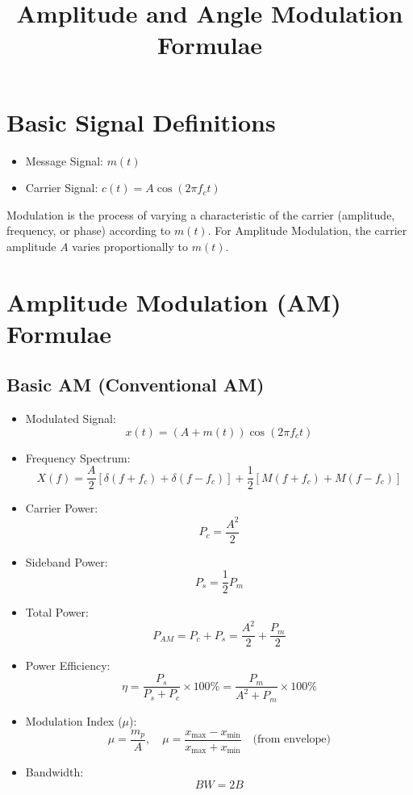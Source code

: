 \documentclass[12pt]{AnantDocumentatioe}
\title{Amplitude and Angle Modulation Formulae}
\author{}
\date{}
\begin{document}
\maketitle

\section{Basic Signal Definitions}

\begin{itemize}
    \item Message Signal: $m(t)$
    \item Carrier Signal: $c(t) = A \cos(2\pi f_c t)$
\end{itemize}

Modulation is the process of varying a characteristic of the carrier (amplitude, frequency, or phase) according to $m(t)$. For Amplitude Modulation, the carrier amplitude $A$ varies proportionally to $m(t)$.

\section{Amplitude Modulation (AM) Formulae}

\subsection{Basic AM (Conventional AM)}

\begin{itemize}
    \item Modulated Signal:
    \[
        x(t) = (A + m(t)) \cos(2\pi f_c t)
    \]
    \item Frequency Spectrum:
    \[
        X(f) = \frac{A}{2}[\delta(f+f_c) + \delta(f-f_c)] + \frac{1}{2}[M(f+f_c) + M(f-f_c)]
    \]
    \item Carrier Power:
    \[
        P_c = \frac{A^2}{2}
    \]
    \item Sideband Power:
    \[
        P_s = \frac{1}{2} P_m
    \]
    \item Total Power:
    \[
        P_{AM} = P_c + P_s = \frac{A^2}{2} + \frac{P_m}{2}
    \]
    \item Power Efficiency:
    \[
        \eta = \frac{P_s}{P_s + P_c} \times 100\% = \frac{P_m}{A^2 + P_m} \times 100\%
    \]
    \item Modulation Index ($\mu$):
    \[
        \mu = \frac{m_p}{A}, \quad \mu = \frac{x_{\max}-x_{\min}}{x_{\max}+x_{\min}} \quad \text{(from envelope)}
    \]
    \item Bandwidth:
    \[
        BW = 2B
    \]
\end{itemize}
\end{document}
